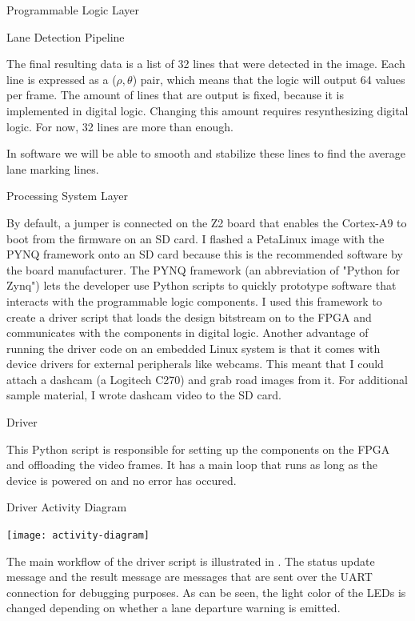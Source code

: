\documentclass{matthijs}
\begin{document}
\begin{hoofdstuk}{Programmable Logic Layer}
\begin{paragraaf}{Lane Detection Pipeline}
			\bigskip

			The final resulting data is a list of 32 lines that were detected in the image.
			Each line is expressed as a ($ \rho, \theta $) pair, which means that the logic will output 64 values per frame.
			The amount of lines that are output is fixed, because it is implemented in digital logic.
			Changing this amount requires resynthesizing digital logic.
			For now, 32 lines are more than enough.

			In software we will be able to smooth and stabilize these lines to find the average lane marking lines.

		\end{paragraaf}

	\end{hoofdstuk}

	\begin{hoofdstuk}{Processing System Layer}

		By default, a jumper is connected on the Z2 board that enables the Cortex-A9 to boot from the firmware on an SD card.
		I flashed a PetaLinux image with the PYNQ framework onto an SD card because this is the recommended software by the board manufacturer.
		The PYNQ framework (an abbreviation of "Python for Zynq") lets the developer use Python scripts to quickly prototype software that interacts with the programmable logic components.
		I used this framework to create a driver script that loads the design bitstream on to the FPGA and communicates with the components in digital logic.
		Another advantage of running the driver code on an embedded Linux system is that it comes with device drivers for external peripherals like webcams.
		This meant that I could attach a dashcam (a Logitech C270) and grab road images from it. For additional sample material, I wrote dashcam video to the SD card.

		\begin{paragraaf}{Driver}

			This Python script is responsible for setting up the components on the FPGA and offloading the video frames.
			It has a main loop that runs as long as the device is powered on and no error has occured.

			\begin{figuur}{Driver Activity Diagram}
				\singlespacing
				\centerline{
					\texttt{[image: activity-diagram]} 
				}
				\onehalfspacing
			\end{figuur}
			
			The main workflow of the driver script is illustrated in .
			The status update message and the result message are messages that are sent over the UART connection for debugging purposes.
			As can be seen, the light color of the LEDs is changed depending on whether a lane departure warning is emitted.


\end{paragraaf}
\end{hoofdstuk}
\end{document}
